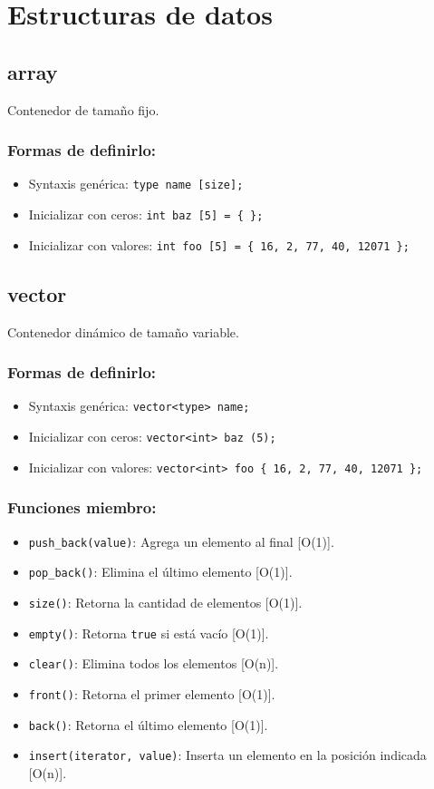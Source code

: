 \section{Estructuras de datos}
\label{sec:estructuras_de_datos}

\subsection{array}
\label{subsec:std_array}
Contenedor de tamaño fijo. 

\subsubsection{Formas de definirlo:}
\begin{itemize}
  \item Syntaxis genérica: \texttt{type name [size];}
  \item Inicializar con ceros: \texttt{int baz [5] = \{ \};}
  \item Inicializar con valores: \texttt{int foo [5] = \{ 16, 2, 77, 40, 12071 \};}
\end{itemize}

\subsection{vector}
\label{subsec:std_vector}
Contenedor dinámico de tamaño variable.

\subsubsection{Formas de definirlo:}
\begin{itemize}
  \item Syntaxis genérica: \texttt{vector<type> name;}
  \item Inicializar con ceros: \texttt{vector<int> baz (5);}
  \item Inicializar con valores: \texttt{vector<int> foo \{ 16, 2, 77, 40, 12071 \};}
\end{itemize}

\subsubsection{Funciones miembro:}
\begin{itemize}
  \item \texttt{push\_back(value)}: Agrega un elemento al final [O(1)].
  \item \texttt{pop\_back()}: Elimina el último elemento [O(1)].
  \item \texttt{size()}: Retorna la cantidad de elementos [O(1)].
  \item \texttt{empty()}: Retorna \texttt{true} si está vacío [O(1)].
  \item \texttt{clear()}: Elimina todos los elementos [O(n)].
  \item \texttt{front()}: Retorna el primer elemento [O(1)].
  \item \texttt{back()}: Retorna el último elemento [O(1)].
  \item \texttt{insert(iterator, value)}: Inserta un elemento en la posición indicada [O(n)].
\end{itemize}

